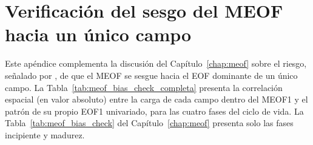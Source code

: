 \chapter{Verificación del sesgo del MEOF hacia un único campo}\label{apendice:meof_bias}

Este apéndice complementa la discusión del Capítulo~\ref{chap:meof} sobre el riesgo, señalado por \citet{bretherton1992intercomparison}, de que el MEOF se sesgue hacia el EOF dominante de un único campo. La Tabla~\ref{tab:meof_bias_check_completa} presenta la correlación espacial (en valor absoluto) entre la carga de cada campo dentro del MEOF1 y el patrón de su propio EOF1 univariado, para las cuatro fases del ciclo de vida. La Tabla~\ref{tab:meof_bias_check} del Capítulo~\ref{chap:meof} presenta solo las fases incipiente y madurez.



